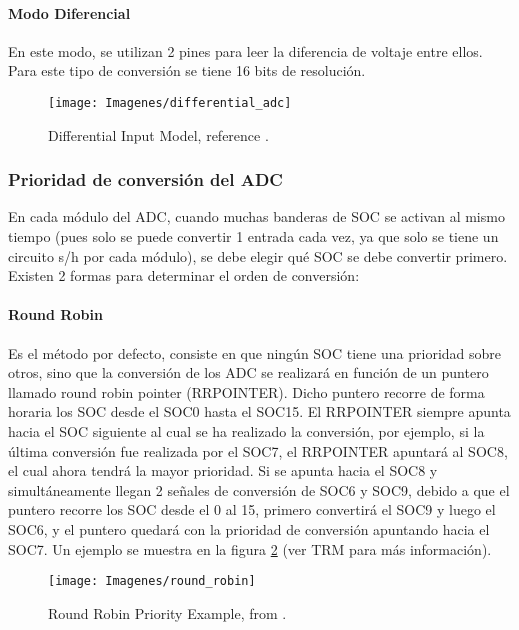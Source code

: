 \paragraph{Modo Diferencial}
En este modo, se utilizan 2 pines para leer la diferencia de voltaje entre ellos. Para este tipo de conversión se tiene 16 bits de resolución.

\begin{figure}[h]
	\centering
	\texttt{[image: Imagenes/differential\_adc]}
	\caption{Differential Input Model, reference \cite[page 1560]{tmr}.}
	\label{fig:5}
\end{figure}

\subsubsection{Prioridad de conversión del ADC}

En cada módulo del ADC, cuando muchas banderas de SOC se activan al mismo tiempo (pues solo se puede convertir 1 entrada cada vez, ya que solo se tiene un circuito s/h por cada módulo), se debe elegir qué SOC se debe convertir primero. Existen 2 formas para determinar el orden de conversión:

\paragraph{Round Robin}
\hfill \break \par
Es el método por defecto, consiste en que ningún SOC tiene una prioridad sobre otros, sino que la conversión de los ADC se realizará en función de un puntero llamado round robin pointer (RRPOINTER). Dicho puntero recorre de forma horaria los SOC desde el SOC0 hasta el SOC15. El RRPOINTER siempre apunta hacia el SOC siguiente al cual se ha realizado la conversión, por ejemplo, si la última conversión fue realizada por el SOC7, el RRPOINTER apuntará al SOC8, el cual ahora tendrá la mayor prioridad. Si se apunta hacia el SOC8 y simultáneamente llegan 2 señales de conversión de SOC6 y SOC9, debido a que el puntero recorre los SOC desde el 0 al 15, primero convertirá el SOC9 y luego el SOC6, y el puntero quedará con la prioridad de conversión apuntando hacia el SOC7.
Un ejemplo se muestra en la figura \ref{fig:6} (ver TRM para más información).
\begin{figure}[H]
	\centering
	\texttt{[image: Imagenes/round\_robin]}
	\caption{Round Robin Priority Example, from \cite[page 1565]{tmr}.}
	\label{fig:6}
\end{figure}

